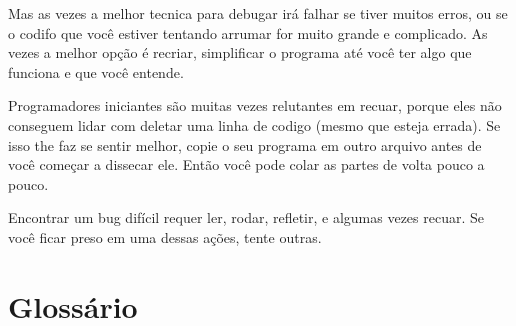 Mas as vezes a melhor tecnica para debugar irá falhar se tiver muitos
erros, ou se o codifo que você estiver tentando arrumar for muito grande
e complicado. As vezes a melhor opção é recriar, simplificar o programa
até você ter algo que funciona e que você entende.

Programadores iniciantes são muitas vezes relutantes em recuar, porque
eles não conseguem lidar com deletar uma linha de codigo (mesmo que
esteja errada). Se isso the faz se sentir melhor, copie o seu programa
em outro arquivo antes de você começar a dissecar ele. Então você pode
colar as partes de volta pouco a pouco.

Encontrar um bug difícil requer ler, rodar, refletir, e algumas vezes
recuar. Se você ficar preso em uma dessas ações, tente outras.


\section{Glossário}

